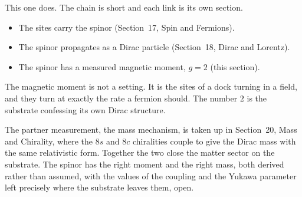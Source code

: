 This one does. The chain is short and each link is its own section.

\begin{itemize}
\item The sites carry the spinor (Section~17, Spin and Fermions).
\item The spinor propagates as a Dirac particle (Section~18, Dirac and Lorentz).
\item The spinor has a measured magnetic moment, $g = 2$ (this section).
\end{itemize}

\begin{principle}
The magnetic moment is not a setting. It is the sites of a dock turning in a field, and they turn at exactly the rate a fermion should. The number $2$ is the substrate confessing its own Dirac structure.
\end{principle}

The partner measurement, the mass mechanism, is taken up in Section~20, Mass and Chirality, where the $8s$ and $8c$ chiralities couple to give the Dirac mass with the same relativistic form. Together the two close the matter sector on the substrate. The spinor has the right moment and the right mass, both derived rather than assumed, with the values of the coupling and the Yukawa parameter left precisely where the substrate leaves them, open.

